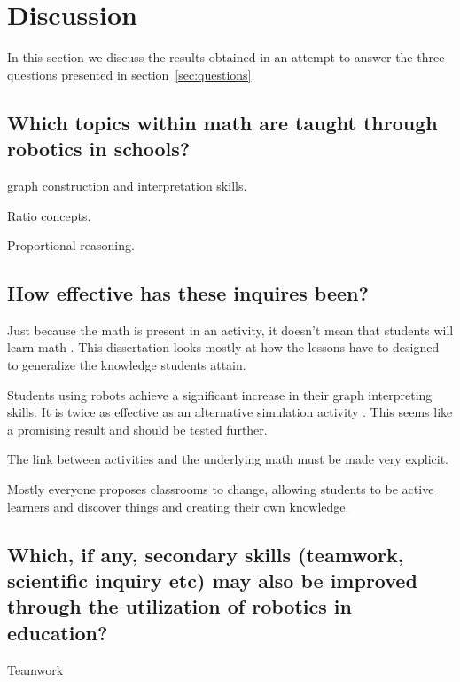 \section*{Discussion}
In this section we discuss the results obtained in an attempt to answer the three questions presented in section~\ref{sec:questions}.

\subsection*{Which topics within math are taught through robotics in schools?}
 graph construction and interpretation skills.

\bigskip\noindent
{} Ratio concepts. 

\bigskip\noindent
{} Proportional reasoning.

\subsection*{How effective has these inquires been?}
Just because the math is present in an activity, it doesn't mean that students will learn math . This dissertation looks mostly at how the lessons have to designed to generalize the knowledge students attain.

Students using robots achieve a significant increase in their graph interpreting skills. It is twice as effective as an alternative simulation activity . This seems like a promising result and should be tested further. 

The link between activities and the underlying math must be made very explicit. 

Mostly everyone proposes classrooms to change, allowing students to be active learners and discover things and creating their own knowledge.

\subsection*{Which, if any, secondary skills (teamwork, scientific inquiry etc) may also be improved through the utilization of robotics in education?}

Teamwork \cite{mitnik2009collaborative, }


